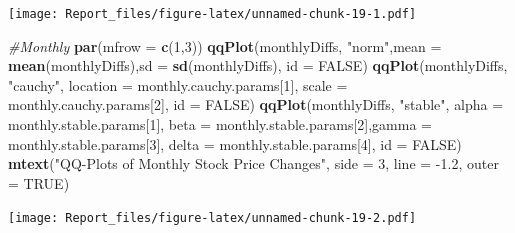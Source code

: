 \documentclass[]{article}
\newenvironment{Shaded}{\begin{snugshade}}{\end{snugshade}}
\newcommand{\CommentTok}[1]{\textcolor[rgb]{0.56,0.35,0.01}{\textit{#1}}}
\newcommand{\DataTypeTok}[1]{\textcolor[rgb]{0.13,0.29,0.53}{#1}}
\newcommand{\DecValTok}[1]{\textcolor[rgb]{0.00,0.00,0.81}{#1}}
\newcommand{\FloatTok}[1]{\textcolor[rgb]{0.00,0.00,0.81}{#1}}
\newcommand{\KeywordTok}[1]{\textcolor[rgb]{0.13,0.29,0.53}{\textbf{#1}}}
\newcommand{\NormalTok}[1]{#1}
\newcommand{\OtherTok}[1]{\textcolor[rgb]{0.56,0.35,0.01}{#1}}
\newcommand{\StringTok}[1]{\textcolor[rgb]{0.31,0.60,0.02}{#1}}
\begin{document}
\texttt{[image: Report\_files/figure-latex/unnamed-chunk-19-1.pdf]}

\begin{Shaded}
\begin{Highlighting}[]
\CommentTok{#Monthly}
\KeywordTok{par}\NormalTok{(}\DataTypeTok{mfrow =} \KeywordTok{c}\NormalTok{(}\DecValTok{1}\NormalTok{,}\DecValTok{3}\NormalTok{))}
\KeywordTok{qqPlot}\NormalTok{(monthlyDiffs, }\StringTok{"norm"}\NormalTok{,}\DataTypeTok{mean =}  \KeywordTok{mean}\NormalTok{(monthlyDiffs),}\DataTypeTok{sd =}  \KeywordTok{sd}\NormalTok{(monthlyDiffs), }\DataTypeTok{id =} \OtherTok{FALSE}\NormalTok{)}
\KeywordTok{qqPlot}\NormalTok{(monthlyDiffs, }\StringTok{"cauchy"}\NormalTok{, }\DataTypeTok{location =}\NormalTok{ monthly.cauchy.params[}\DecValTok{1}\NormalTok{], }\DataTypeTok{scale =}\NormalTok{ monthly.cauchy.params[}\DecValTok{2}\NormalTok{], }\DataTypeTok{id =} \OtherTok{FALSE}\NormalTok{)}
\KeywordTok{qqPlot}\NormalTok{(monthlyDiffs, }\StringTok{"stable"}\NormalTok{, }\DataTypeTok{alpha =}\NormalTok{ monthly.stable.params[}\DecValTok{1}\NormalTok{], }\DataTypeTok{beta =}\NormalTok{ monthly.stable.params[}\DecValTok{2}\NormalTok{],}\DataTypeTok{gamma =}\NormalTok{ monthly.stable.params[}\DecValTok{3}\NormalTok{], }\DataTypeTok{delta =}\NormalTok{ monthly.stable.params[}\DecValTok{4}\NormalTok{], }\DataTypeTok{id =} \OtherTok{FALSE}\NormalTok{)}
\KeywordTok{mtext}\NormalTok{(}\StringTok{"QQ-Plots of Monthly Stock Price Changes"}\NormalTok{, }\DataTypeTok{side =} \DecValTok{3}\NormalTok{, }\DataTypeTok{line =} \FloatTok{-1.2}\NormalTok{, }\DataTypeTok{outer =} \OtherTok{TRUE}\NormalTok{)}
\end{Highlighting}
\end{Shaded}

\texttt{[image: Report\_files/figure-latex/unnamed-chunk-19-2.pdf]}
\end{document}

